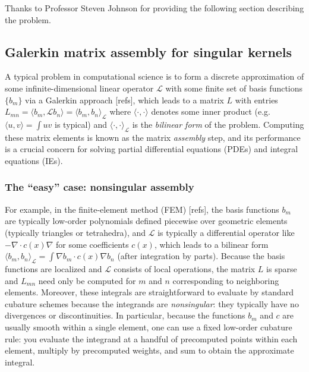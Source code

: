 




Thanks to Professor Steven Johnson for providing the following section describing
the problem.

\subsection{Galerkin matrix assembly for singular kernels}

A typical problem in computational science is to form a discrete approximation of some infinite-dimensional linear operator $\mathcal{L}$ with some finite set of basis functions $\{ b_m \}$ via a Galerkin approach [refs], which leads to a matrix $L$ with entries $L_{mn} = \langle b_m, \mathcal{L} b_n \rangle = \langle b_m, b_n \rangle_\mathcal{L}$ where $\langle \cdot, \cdot \rangle$ denotes some inner product (e.g. $\langle u, v \rangle = \int u v$ is typical) and  $\langle \cdot, \cdot \rangle_\mathcal{L}$ is the \emph{bilinear form} of the problem.  Computing these matrix elements is known as the matrix \emph{assembly} step, and its performance is a crucial concern for solving partial differential equations (PDEs) and integral equations (IEs).

\subsubsection{The ``easy'' case: nonsingular assembly}

For example, in the finite-element method (FEM) [refs], the basis functions $b_m$ are typically low-order polynomials defined piecewise over geometric elements (typically triangles or tetrahedra), and $\mathcal{L}$ is typically a differential operator like $-\nabla \cdot c(x) \nabla$ for some coefficients $c(x)$, which leads to a bilinear form  $\langle b_m, b_n \rangle_\mathcal{L} = \int \nabla b_m \cdot c(x) \nabla b_n$ (after integration by parts).   Because the basis functions are localized and $\mathcal{L}$ consists of local operations, the matrix $L$ is sparse and $L_{mn}$ need only be computed for $m$ and $n$ corresponding to neighboring elements. Moreover, these integrals are straightforward to evaluate by standard cubature schemes because the integrands are \emph{nonsingular}: they typically have no divergences or discontinuities. In particular, because the functions $b_m$ and $c$ are usually smooth within a single element, one can use a fixed low-order cubature rule: you evaluate the integrand at a handful of precomputed points within each element, multiply by precomputed weights, and sum to obtain the approximate integral.

